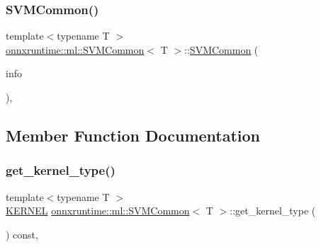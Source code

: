 \subsubsection{\texorpdfstring{S\+V\+M\+Common()}{SVMCommon()}}
{\footnotesize\ttfamily template$<$typename T $>$ \\
\mbox{\hyperlink{classonnxruntime_1_1ml_1_1SVMCommon}{onnxruntime\+::ml\+::\+S\+V\+M\+Common}}$<$ T $>$\+::\mbox{\hyperlink{classonnxruntime_1_1ml_1_1SVMCommon}{S\+V\+M\+Common}} (\begin{DoxyParamCaption}\item[{const \mbox{\hyperlink{classonnxruntime_1_1OpKernelInfo}{Op\+Kernel\+Info}} \&}]{info }\end{DoxyParamCaption})\hspace{0.3cm}{\ttfamily [inline]}, {\ttfamily [protected]}}



\subsection{Member Function Documentation}
\mbox{\label{classonnxruntime_1_1ml_1_1SVMCommon_a46d33c53c4260a2cdae57563385e79f1}} 
\subsubsection{\texorpdfstring{get\+\_\+kernel\+\_\+type()}{get\_kernel\_type()}}
{\footnotesize\ttfamily template$<$typename T $>$ \\
\mbox{\hyperlink{namespaceonnxruntime_1_1ml_a3b945a42c5d7da1297e6b831fe7ae807}{K\+E\+R\+N\+EL}} \mbox{\hyperlink{classonnxruntime_1_1ml_1_1SVMCommon}{onnxruntime\+::ml\+::\+S\+V\+M\+Common}}$<$ T $>$\+::get\+\_\+kernel\+\_\+type (\begin{DoxyParamCaption}{ }\end{DoxyParamCaption}) const\hspace{0.3cm}{\ttfamily [inline]}, {\ttfamily [protected]}}

\mbox{\label{classonnxruntime_1_1ml_1_1SVMCommon_a90f1459ad4ae620be527218ad2a738ad}} 
